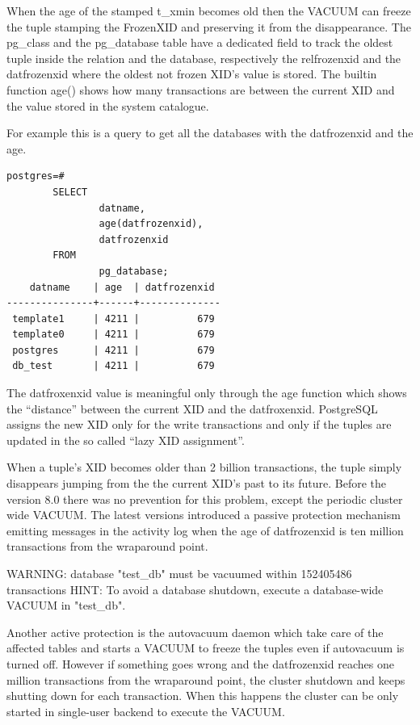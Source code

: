 When the age of the stamped t\_xmin becomes old then the VACUUM can freeze 
the tuple stamping the FrozenXID and preserving it from the disappearance. The pg\_class and the 
pg\_database table have a dedicated field to track the oldest tuple inside the relation and the 
database, respectively the relfrozenxid  and the datfrozenxid where the oldest not frozen XID's 
value is stored. The builtin function age() shows how many transactions are between 
the current XID and the value stored in the system catalogue. \newline

For example this is a query to get all the databases with the datfrozenxid and the age.\newpage

\begin{lstlisting}[style=pgsql]
 postgres=# 
        SELECT 
                datname,
                age(datfrozenxid),
                datfrozenxid 
        FROM 
                pg_database;
    datname    | age  | datfrozenxid 
---------------+------+--------------
 template1     | 4211 |          679
 template0     | 4211 |          679
 postgres      | 4211 |          679
 db_test       | 4211 |          679

\end{lstlisting}

The datfroxenxid value is meaningful only through the age function which shows the
``distance'' between the current XID and the datfroxenxid. PostgreSQL assigns the new 
XID only for the write transactions and only if the tuples are updated in the so called ``lazy XID 
assignment''.\newline 


When a tuple's XID becomes older than 2 billion transactions, the tuple simply disappears  jumping 
from the the current XID's past to its future. Before the version 8.0 there was no prevention
for this problem, except the periodic cluster wide VACUUM. The latest versions introduced a 
passive protection mechanism emitting messages in the activity log when the age of datfrozenxid is  
ten million transactions from the wraparound point.

\begin{smallverbatim}
WARNING:  database "test_db" must be vacuumed within 152405486 transactions
HINT:  To avoid a database shutdown, execute a database-wide VACUUM in 
"test_db".
\end{smallverbatim}

Another active protection is the autovacuum daemon which take care of the affected tables and 
starts a VACUUM to freeze the tuples even  if autovacuum is turned off. However if something goes 
wrong and the datfrozenxid reaches one million transactions from the wraparound point, the 
cluster shutdown and keeps shutting down for each transaction. When this happens the cluster 
can be only  started in single-user backend to execute the VACUUM.\newline

